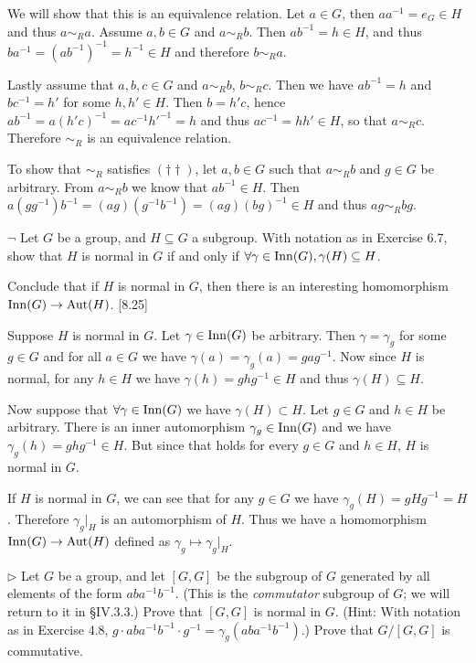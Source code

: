 \begin{solution}
	We will show that this is an equivalence relation. Let $a \in G$, then $aa^{-1} = e_G \in H$ and thus $a \sim_R a$. Assume $a, b \in G$ and $a \sim_R b$. Then $ab^{-1} = h \in H$, and thus $b a^{-1} = (a b^{-1})^{-1} = h^{-1} \in H$ and therefore $b \sim_R a$.
	
	Lastly assume that $a, b, c \in G$ and $a \sim_R b$, $b \sim_R c$. Then we have $ab^{-1} = h$ and $bc^{-1} = h'$ for some $h, h' \in H$. Then $b = h'c$, hence $ab^{-1} = a(h'c)^{-1} = ac^{-1}h'^{-1} = h$ and thus $ac^{-1} = hh' \in H$, so that $a \sim_R c$. Therefore $\sim_R$ is an equivalence relation.
	
	To show that $\sim_R$ satisfies $(\dagger \dagger)$, let $a, b \in G$ such that $a \sim_R b$ and $g \in G$ be arbitrary.	From $a \sim_R b$ we know that $ab^{-1} \in H$. Then $a (gg^{-1}) b^{-1} = (ag)(g^{-1}b^{-1}) = (ag)(bg)^{-1} \in H$ and thus $ag \sim_R bg$.
\end{solution}

\begin{problem}
	$\neg$ Let $G$ be a group, and $H \subseteq G$ a subgroup. With notation as in Exercise 6.7, show that $H$ is normal in $G$ if and only if $\forall \gamma \in \mathrm{Inn}(G), \gamma(H) \subseteq H$.
	
	Conclude that if $H$ is normal in $G$, then there is an interesting homomorphism $\mathrm{Inn}(G) \to \mathrm{Aut}(H)$. [8.25]
\end{problem}

\begin{solution}
	Suppose $H$ is normal in $G$. Let $\gamma \in \mathrm{Inn}(G)$ be arbitrary. Then $\gamma = \gamma_g$ for some $g \in G$ and for all $a \in G$ we have $\gamma(a) = \gamma_g(a) = gag^{-1}$. Now since $H$ is normal, for any $h \in H$ we have $\gamma(h) = ghg^{-1} \in H$ and thus $\gamma(H) \subseteq H$.
	
	Now suppose that $\forall \gamma \in \mathrm{Inn}(G)$ we have $\gamma(H) \subset H$. Let $g \in G$ and $h \in H$ be arbitrary. There is an inner automorphism $\gamma_g \in \mathrm{Inn}(G)$ and we have $\gamma_g(h) = ghg^{-1} \in H$. But since that holds for every $g \in G$ and $h \in H$, $H$ is normal in $G$.
	
	If $H$ is normal in $G$, we can see that for any $g \in G$ we have $\gamma_g(H) = gHg^{-1} = H$. Therefore $\gamma_g|_H$ is an automorphism of $H$. Thus we have a homomorphism $\mathrm{Inn}(G) \to \mathrm{Aut}(H)$ defined as $\gamma_g \mapsto \gamma_g|_H$.
\end{solution}

\begin{problem}
	$\triangleright$ Let $G$ be a group, and let $[G, G]$ be the subgroup of $G$ generated by all elements of the form $aba^{-1}b^{-1}$. (This is the \emph{commutator} subgroup of $G$; we will return to it in \S IV.3.3.) Prove that $[G, G]$ is normal in $G$. (Hint: With notation as in Exercise 4.8, $g \cdot aba^{-1}b^{-1} \cdot g^{-1} = \gamma_g(aba^{-1}b^{-1})$.) Prove that $G/[G, G]$ is commutative.
\end{problem}

